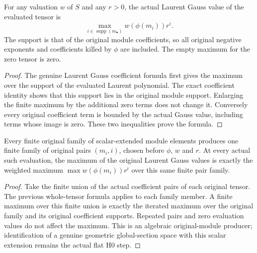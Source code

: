 \begin{theorem}\label{thm:laurent-module-actual-gauss-maximum}
\leanok
For any valuation $w$ of $S$ and any $r>0$, the actual Laurent Gauss
value of the evaluated tensor is
\[
 \max_{i\in\operatorname{supp}(m_\bullet)}w(\phi(m_i))r^i.
\]
The support is that of the original module coefficients, so all
original negative exponents and coefficients killed by $\phi$ are
included. The empty maximum for the zero tensor is zero.
\end{theorem}
\begin{proof}
The genuine Laurent Gauss coefficient formula first gives the
maximum over the support of the evaluated Laurent polynomial.
The exact coefficient identity shows that this support lies in the
original module support. Enlarging the finite maximum by the
additional zero terms does not change it. Conversely every original
coefficient term is bounded by the actual Gauss value, including
terms whose image is zero. These two inequalities prove the formula.
\end{proof}

\begin{theorem}\label{thm:laurent-module-actual-finite-family}
\leanok
Every finite original family of scalar-extended module elements
produces one finite family of original pairs $(m_i,i)$, chosen before
$\phi$, $w$ and $r$. At every actual such evaluation, the maximum of
the original Laurent Gauss values is exactly the weighted maximum
$\max w(\phi(m_i))r^i$ over this same finite pair family.
\end{theorem}
\begin{proof}
Take the finite union of the actual coefficient pairs of each
original tensor. The previous whole-tensor formula applies to each
family member. A finite maximum over this finite union is exactly
the iterated maximum over the original family and its original
coefficient supports. Repeated pairs and zero evaluation values do
not affect the maximum. This is an algebraic original-module
producer; identification of a genuine geometric global-section
space with this scalar extension remains the actual flat H0 step.
\end{proof}
